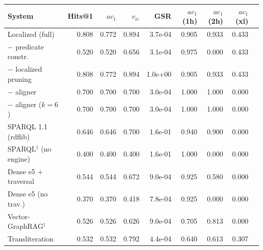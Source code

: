 {\setlength{\tabcolsep}{2.2pt}\scriptsize%
\begin{tabular}{lrrrrrrrr}
\toprule
System & Hits@1 & $ac_1$ & $v_{ic}$ & GSR & $ac_1$(1h) & $ac_1$(2h) & $ac_1$(xl) \\
\midrule
Localized (full) & 0.808 & 0.772 & 0.894 & 3.7e-04 & 0.905 & 0.933 & 0.433 \\
$-$ predicate constr. & 0.520 & 0.520 & 0.656 & 3.1e-04 & 0.975 & 0.000 & 0.433 \\
$-$ localized pruning & 0.808 & 0.772 & 0.894 & 1.0e+00 & 0.905 & 0.933 & 0.433 \\
$-$ aligner & 0.700 & 0.700 & 0.700 & 3.0e-04 & 1.000 & 1.000 & 0.000 \\
$-$ aligner ($k{=}6$) & 0.700 & 0.700 & 0.700 & 3.0e-04 & 1.000 & 1.000 & 0.000 \\
SPARQL 1.1 (rdflib) & 0.646 & 0.646 & 0.700 & 1.6e-01 & 0.940 & 0.900 & 0.000 \\
SPARQL$^{\dagger}$ (no engine) & 0.400 & 0.400 & 0.400 & 1.6e-01 & 1.000 & 0.000 & 0.000 \\
Dense e5 $+$ traversal & 0.544 & 0.544 & 0.672 & 9.0e-04 & 0.925 & 0.580 & 0.000 \\
Dense e5 (no trav.) & 0.370 & 0.370 & 0.418 & 7.8e-04 & 0.925 & 0.000 & 0.000 \\
Vector-GraphRAG$^{\dagger}$ & 0.526 & 0.526 & 0.626 & 9.0e-04 & 0.705 & 0.813 & 0.000 \\
Transliteration & 0.532 & 0.532 & 0.792 & 4.4e-04 & 0.640 & 0.613 & 0.307 \\
\bottomrule
\end{tabular}}